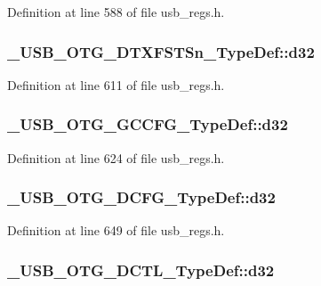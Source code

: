 Definition at line 588 of file usb\-\_\-regs.\-h.

\hypertarget{group___u_s_b___o_t_g___d_r_i_v_e_r_ga4862ebb577ee8e26382e28909ab0c275}{
\subsubsection[{d32}]{ \-\_\-\-U\-S\-B\-\_\-\-O\-T\-G\-\_\-\-D\-T\-X\-F\-S\-T\-Sn\-\_\-\-Type\-Def\-::d32}}\label{group___u_s_b___o_t_g___d_r_i_v_e_r_ga4862ebb577ee8e26382e28909ab0c275}


Definition at line 611 of file usb\-\_\-regs.\-h.

\hypertarget{group___u_s_b___o_t_g___d_r_i_v_e_r_ga92b0a669aa19aa3f11506e615975328b}{
\subsubsection[{d32}]{ \-\_\-\-U\-S\-B\-\_\-\-O\-T\-G\-\_\-\-G\-C\-C\-F\-G\-\_\-\-Type\-Def\-::d32}}\label{group___u_s_b___o_t_g___d_r_i_v_e_r_ga92b0a669aa19aa3f11506e615975328b}


Definition at line 624 of file usb\-\_\-regs.\-h.

\hypertarget{group___u_s_b___o_t_g___d_r_i_v_e_r_ga9fdcd91e0a212a4b3e195b67d79b033b}{
\subsubsection[{d32}]{ \-\_\-\-U\-S\-B\-\_\-\-O\-T\-G\-\_\-\-D\-C\-F\-G\-\_\-\-Type\-Def\-::d32}}\label{group___u_s_b___o_t_g___d_r_i_v_e_r_ga9fdcd91e0a212a4b3e195b67d79b033b}


Definition at line 649 of file usb\-\_\-regs.\-h.

\hypertarget{group___u_s_b___o_t_g___d_r_i_v_e_r_gad10935a4e428299cce281622bdfe56fe}{
\subsubsection[{d32}]{ \-\_\-\-U\-S\-B\-\_\-\-O\-T\-G\-\_\-\-D\-C\-T\-L\-\_\-\-Type\-Def\-::d32}}\label{group___u_s_b___o_t_g___d_r_i_v_e_r_gad10935a4e428299cce281622bdfe56fe}


